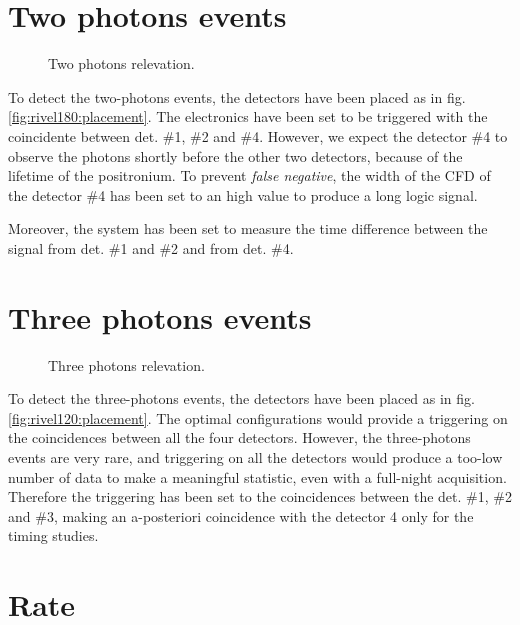 \documentclass[11pt,a4 paper]{article}
\begin{document}
\section{Two photons events}

\begin{figure}[H]
    \centering
     \quad
    \caption{Two photons relevation.}
    \label{fig:rivel180}
\end{figure}

To detect the two-photons events, the detectors have been placed as in fig. \ref{fig:rivel180:placement}. The electronics have been set to be triggered with the coincidente between det. \#1, \#2 and \#4. However, we expect the detector \#4 to observe the photons shortly before the other two detectors, because of the lifetime of the positronium. To prevent \emph{false negative}, the width of the CFD of the detector \#4 has been set to an high value to produce a long logic signal.

Moreover, the system has been set to measure the time difference between the signal from det. \#1 and \#2 and from det. \#4. 

\section{Three photons events}

\begin{figure}[H]
    \centering
     \quad
    \caption{Three photons relevation.}
    \label{fig:rivel120}
\end{figure}

To detect the three-photons events, the detectors have been placed as in fig. \ref{fig:rivel120:placement}. The optimal configurations would provide a triggering on the coincidences between all the four detectors. However, the three-photons events are very rare, and triggering on all the detectors would produce a too-low number of data to make a meaningful statistic, even with a full-night acquisition. Therefore the triggering has been set to the coincidences between the det. \#1, \#2 and \#3, making an a-posteriori coincidence with the detector 4 only for the timing studies.

\section{Rate}
\end{document}

